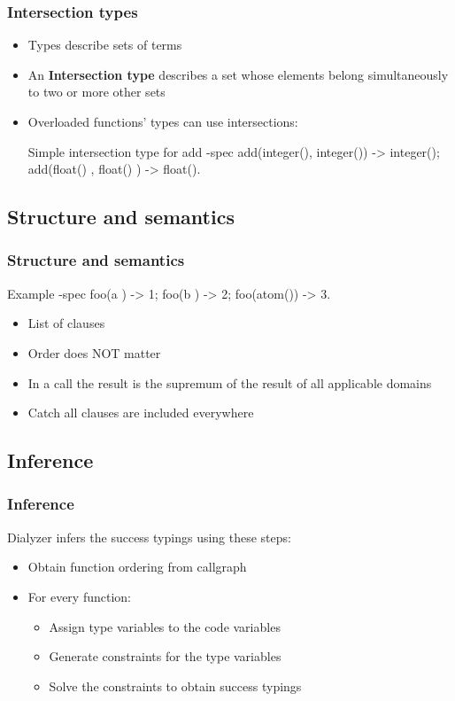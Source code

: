 \documentclass{beamer}
\begin{document}
\begin{frame}[fragile]
  \frametitle{Intersection types}
  \begin{itemize}
  \item Types describe sets of terms \pause
  \item An \textbf{Intersection type} describes a set whose elements
    belong simultaneously to two or more other sets \pause
  \item Overloaded functions' types can use intersections:
    \begin{code}{Simple intersection type for add}
-spec add(integer(), integer()) -> integer();
      add(float()  , float()  ) -> float().
    \end{code}
  \end{itemize}
\end{frame}

\subsection{Structure and semantics}

\begin{frame}[fragile]
  \frametitle{Structure and semantics}
  \begin{code}{Example}
-spec foo(a     ) -> 1;
      foo(b     ) -> 2;
      foo(atom()) -> 3.
  \end{code}
  \begin{itemize}
  \item List of clauses \pause
  \item Order does NOT matter \pause
  \item In a call the result is the supremum of the result of all
    applicable domains \pause
  \item Catch all clauses are included everywhere
  \end{itemize}
\end{frame}

\subsection{Inference}

\begin{frame}
  \frametitle{Inference}
  Dialyzer infers the success typings using these steps:
  \begin{itemize}
  \item Obtain function ordering from callgraph
  \item For every function:
    \begin{itemize}
    \item Assign type variables to the code variables
    \item Generate constraints for the type variables
    \item Solve the constraints to obtain success typings
    \end{itemize}
  \end{itemize}
\end{frame}
\end{document}

